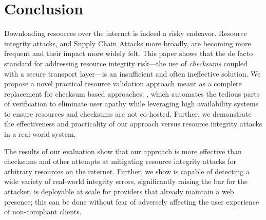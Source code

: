 \section{Conclusion} \label{sec:conclusion}


Downloading resources over the internet is indeed a risky endeavor. Resource
integrity attacks, and Supply Chain Attacks more broadly, are becoming more
frequent and their impact more widely felt. This paper shows that the de facto
standard for addressing resource integrity risk---the use of \emph{checksums}
coupled with a secure transport layer---is an insufficient and often ineffective
solution. We propose a novel practical resource validation approach meant as a
complete replacement for checksum based approaches: \SYSTEM{}, which automates
the tedious parts of verification to eliminate user apathy while leveraging high
availability systems to ensure resources and checksums are not co-hosted.
Further, we demonstrate the effectiveness and practicality of our approach
versus resource integrity attacks in a real-world system.

The results of our evaluation show that our approach is more effective than
checksums and other attempts at mitigating resource integrity attacks for
arbitrary resources on the internet. Further, we show \SYSTEM{} is capable of
detecting a wide variety of real-world integrity errors, significantly raising
the bar for the attacker. \SYSTEM{} is deployable at scale for providers that
already maintain a web presence; this can be done without fear of adversely
affecting the user experience of non-compliant clients.
